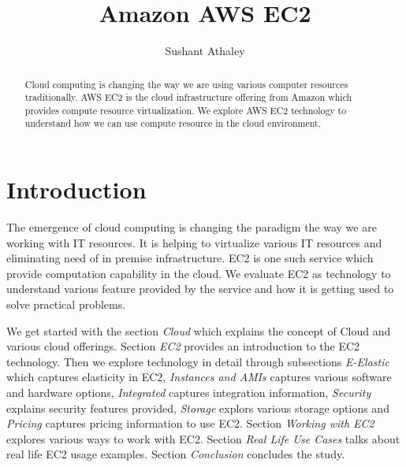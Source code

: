 
\title{Amazon AWS EC2}


\author{Sushant Athaley}

\renewcommand{\shortauthors}{G. v. Laszewski}


\begin{abstract}
Cloud computing is changing the way we are using various computer resources traditionally. AWS EC2 is the cloud infrastructure offering from Amazon which provides compute resource virtualization. We explore AWS EC2 technology to understand how we can use compute resource in the cloud environment. 

\end{abstract}


\maketitle

\section{Introduction}
The emergence of cloud computing is changing the paradigm the way we are working with IT resources. It is helping to virtualize various IT resources and eliminating need of in premise infrastructure. EC2 is one such service which provide computation capability in the cloud. We evaluate EC2 as technology to understand various feature provided by the service and how it is getting used to solve practical problems.

We get started with the section \emph{Cloud} which explains the concept of Cloud and various cloud offerings. Section \emph{EC2} provides an introduction to the EC2 technology. Then we explore technology in detail through subsections \emph{E-Elastic} which captures elasticity in EC2, \emph{Instances and AMIs} captures various software and hardware options, \emph{Integrated} captures integration information, \emph{Security} explains security features provided, \emph{Storage} explors various storage options and \emph{Pricing} captures pricing information to use EC2.
Section \emph{Working with EC2} explores various ways to work with EC2. Section \emph{Real Life Use Cases} talks about real life EC2 usage examples. Section \emph{Conclusion} concludes the study. 

